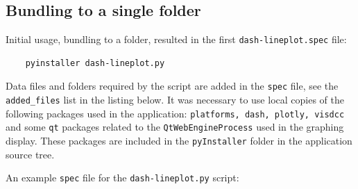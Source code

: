 \subsection{Bundling to a single folder}
\label{sec:bundledFolder}

Initial usage, bundling to a folder, resulted in the first \texttt{dash-lineplot.spec} file:

\footnotesize
\begin{lstlisting}
    pyinstaller dash-lineplot.py
\end{lstlisting}
\normalsize

Data files and folders required by the script are added in the \texttt{spec} file, see the \texttt{added\_files} list in the listing below. It was necessary to use local copies of the following packages used in the application: \texttt{platforms, dash, plotly, visdcc} and some \texttt{qt} packages related to the \texttt{QtWebEngineProcess} used in the graphing display. These packages are included in the \texttt{pyInstaller} folder in the application source tree.

An example \texttt{spec} file for the \texttt{dash-lineplot.py} script:

